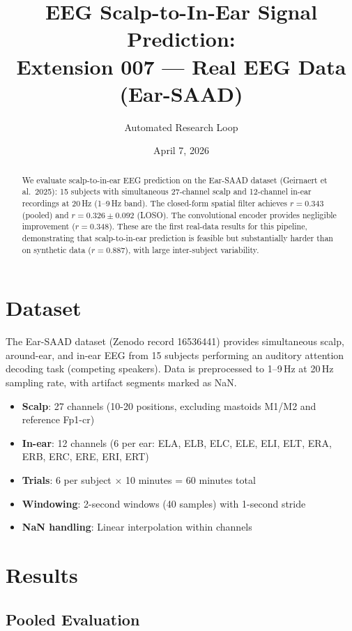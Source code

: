 \documentclass[11pt,a4paper]{article}
\title{EEG Scalp-to-In-Ear Signal Prediction:\\
  Extension 007 --- Real EEG Data (Ear-SAAD)}
\author{Automated Research Loop}
\date{April 7, 2026}
\begin{document}
\maketitle

\begin{abstract}
We evaluate scalp-to-in-ear EEG prediction on the Ear-SAAD dataset
(Geirnaert et al.\ 2025): 15 subjects with simultaneous 27-channel scalp
and 12-channel in-ear recordings at 20\,Hz (1--9\,Hz band). The closed-form
spatial filter achieves $r=0.343$ (pooled) and $r=0.326 \pm 0.092$ (LOSO).
The convolutional encoder provides negligible improvement ($r=0.348$).
These are the first real-data results for this pipeline, demonstrating that
scalp-to-in-ear prediction is feasible but substantially harder than on
synthetic data ($r=0.887$), with large inter-subject variability.
\end{abstract}

\section{Dataset}

The Ear-SAAD dataset (Zenodo record 16536441) provides simultaneous scalp,
around-ear, and in-ear EEG from 15 subjects performing an auditory attention
decoding task (competing speakers). Data is preprocessed to 1--9\,Hz at 20\,Hz
sampling rate, with artifact segments marked as NaN.

\begin{itemize}
  \item \textbf{Scalp}: 27 channels (10-20 positions, excluding mastoids M1/M2
    and reference Fp1-cr)
  \item \textbf{In-ear}: 12 channels (6 per ear: ELA, ELB, ELC, ELE, ELI, ELT,
    ERA, ERB, ERC, ERE, ERI, ERT)
  \item \textbf{Trials}: 6 per subject $\times$ 10 minutes = 60 minutes total
  \item \textbf{Windowing}: 2-second windows (40 samples) with 1-second stride
  \item \textbf{NaN handling}: Linear interpolation within channels
\end{itemize}

\section{Results}

\subsection{Pooled Evaluation}
\end{document}
